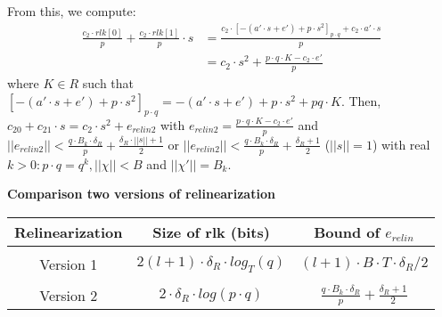 \documentclass[A4paper,12pt]{article}
\begin{document}
From this, we compute:
\begin{equation*}
	\begin{aligned}
	\frac{c_2 \cdot rlk[0]}{p} + 	\frac{c_2 \cdot rlk[1]}{p} \cdot s &= \frac{c_2 \cdot [-(a' \cdot s + e') + p \cdot s^2]_{p \cdot q} + c_2 \cdot a' \cdot s}{p}\\
	&= c_2 \cdot s^2 + \frac{p \cdot q \cdot K - c_2 \cdot e'}{p}
	\end{aligned}
\end{equation*}
where $K \in R$ such that $[-(a' \cdot s + e') + p \cdot s^2]_{p \cdot q} = -(a' \cdot s + e') + p \cdot s^2 + pq \cdot K$.
Then, $c_{20} + c_{21} \cdot s = c_2 \cdot s^2 + e_{relin2}$ with $e_{relin2} = \frac{p \cdot q \cdot K - c_2 \cdot e'}{p}$ and $||e_{relin2} || < \frac{q \cdot B_k \cdot \delta_R}{p} + \frac{\delta_R \cdot ||s|| + 1}{2}$ or $||e_{relin2} || < \frac{q \cdot B_k \cdot \delta_R}{p} + \frac{\delta_R + 1}{2}$ ($||s|| = 1$) with real $k > 0: p \cdot q = q^k, ||\chi|| < B$ and $||\chi'|| = B_k$. \newline

\textbf{Comparison two versions of relinearization}



\begin{table}[ht] 
	\label{tab:tbCmpRLK1}
	\centering      %
	\begin{tabular}{c c c}  %
		\hline\hline                        %
		Relinearization & Size of rlk (bits) & Bound of $e_{relin}$ \\ [0.5ex] %
		\hline   \\          %
		Version 1 & $2(l + 1) \cdot \delta_R \cdot log_T(q)$ & $(l + 1) \cdot B \cdot T \cdot \delta_R / 2$  \\   %
		\hline \\ 
		Version 2 & $2 \cdot \delta_R \cdot log(p \cdot q) $ &  $\frac{q \cdot B_k \cdot \delta_R}{p} + \frac{\delta_R + 1}{2}$ \\ [1ex]       %
	
		\hline     %
	\end{tabular} 
	\label{table:nonlin}  %
\end{table}
\end{document}
